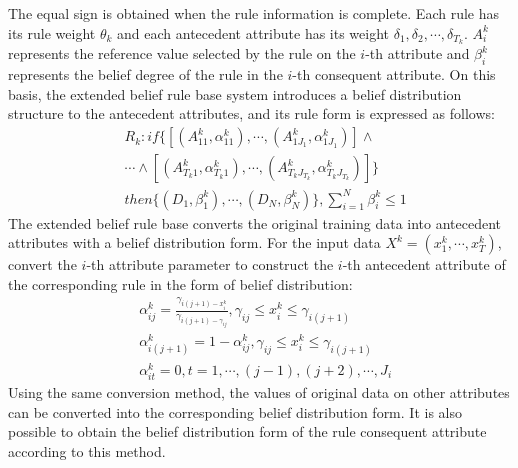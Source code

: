 \documentclass{ieeeaccess}
\begin{document}
The equal sign is obtained when the rule information is complete. Each rule has its rule weight $\theta_k$ and each antecedent attribute has its weight $\delta_{1},\delta_{2},\cdots,\delta_{T_k}$.
$A_i^k$ represents the reference value selected by the rule on the $i$-th attribute and $\beta_i^k$ represents the belief degree of the rule in the $i$-th consequent attribute.
On this basis, the extended belief rule base system introduces a belief distribution structure to the antecedent attributes, and its rule form is expressed as follows:
\begin{equation}
    \begin{split}
        &R_k:if\{[(A_{11}^k,\alpha_{11}^k),\cdots,(A_{1J_1}^k,\alpha_{1J_1}^k)] \wedge \\
        &\cdots \wedge [(A_{T_k1}^k,\alpha_{T_k1}^k), \cdots,(A_{T_kJ_{T_k}}^k,\alpha_{T_kJ_{T_k}}^k)]\}\\
        &then\{(D_1,\beta_1^k),\cdots,(D_N,\beta_N^k)\},\sum_{i=1}^N\beta_i^k\leq1
    \end{split}
\end{equation}
The extended belief rule base converts the original training data into antecedent attributes with a belief distribution form.
For the input data $X^k=(x_1^k,\cdots,x_T^k)$, convert the $i$-th attribute parameter to construct the $i$-th antecedent attribute of the corresponding rule in the form of belief distribution:
\begin{equation}
    \begin{split}
        &\alpha_{ij}^k=\frac{\gamma_{i(j+1)-x_i^k}}{\gamma_{i(j+1)-\gamma_{ij}}},\gamma_{ij}\leq x_i^k\leq \gamma_{i(j+1)}\\
        &\alpha_{i(j+1)}^k=1-\alpha_{ij}^k,\gamma_{ij}\leq x_i^k\leq \gamma_{i(j+1)} \\
        &\alpha_{it}^k=0,t=1,\cdots,(j-1),(j+2),\cdots,J_i
    \end{split}
\end{equation}
Using the same conversion method, the values of original data on other attributes can be converted into the corresponding belief distribution form.
It is also possible to obtain the belief distribution form of the rule consequent attribute according to this method.
\end{document}
